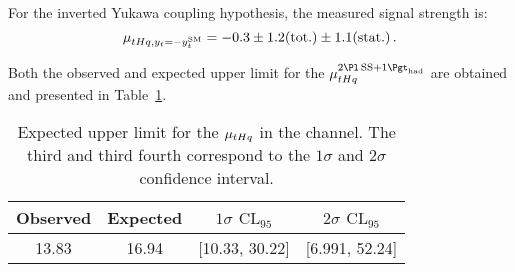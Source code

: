 For the inverted Yukawa coupling hypothesis, the measured signal strength is:
\begin{equation*}
	 \mu_{tHq, y_{t}=-y_{t}^{\text{SM}}} = -0.3 \pm 1.2 (\text{tot.}) \pm 1.1 (\text{stat.}) \label{eq:ChaptH:FullFit:SS:POIs:mu_ytm1} \,.
\end{equation*}




Both the observed and expected upper limit for the $\mu^{\dilepSStau}_{\tHq}$ are obtained and presented in Table~\ref{tab:ASIMOV:SS:ExpectedLimit}. 
\begin{table}[h]
\centering
\begin{tabular}{c | c|c|c}
\toprule
Observed &Expected  	& $1\sigma$ $\text{CL}_{95}$       	& $2\sigma$ $\text{CL}_{95}$       \\ \midrule
13.83 	&16.94  		& [10.33, 30.22] 				& [6.991,  52.24] \\ \bottomrule
\end{tabular}
\caption{Expected upper limit for the $\mu_{tHq}$ in the \dilepSStau channel. 
The third and third fourth correspond to the $1\sigma$ and $2\sigma$ confidence interval. }
\label{tab:ASIMOV:SS:ExpectedLimit}
\end{table}



